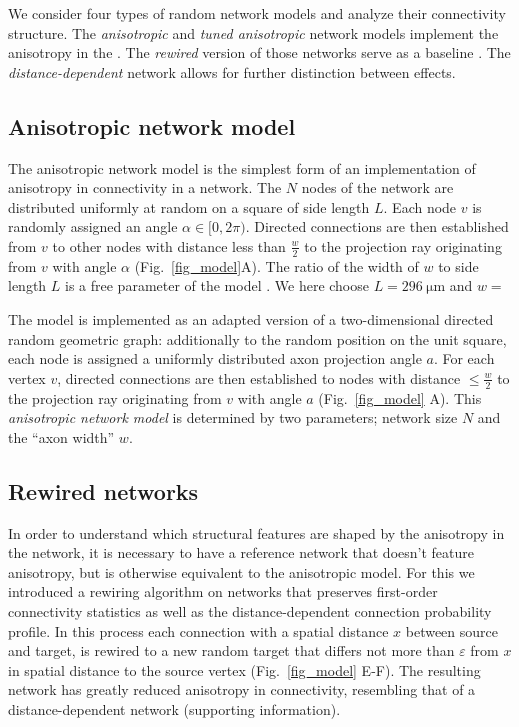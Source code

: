 

We consider four types of random network models and analyze their
connectivity structure. The \textit{anisotropic} and \textit{tuned
anisotropic} network models implement the anisotropy in the
. The \textit{rewired} version of those networks serve as a baseline
. The \textit{distance-dependent} network allows for further
distinction between effects.

\subsection*{Anisotropic network model}

The anisotropic network model is the simplest form of an
implementation of anisotropy in connectivity in a network. The $N$
nodes of the network are distributed uniformly at random on a square
of side length $L$. Each node $v$ is randomly assigned an angle
$\alpha \in [0,2\pi)$. Directed connections are then established from
$v$ to other nodes with distance less than $\frac{w}{2}$ to the
projection ray originating from $v$ with angle $\alpha$
(Fig.~\ref{fig_model}A). The ratio of the width of $w$ to side length
$L$ is a free parameter of the model . We here choose
$L=\SI{296}{\micro\meter}$ and $w=$

The model is implemented as an adapted version of a two-dimensional
directed random geometric graph: additionally to the random position
on the unit square, each node is assigned a uniformly distributed axon
projection angle $a$. For each vertex $v$, directed connections are
then established to nodes with distance $\leq \frac{w}{2}$ to the
projection ray originating from $v$ with angle $a$
(Fig.~\ref{fig_model} A). This \textit{anisotropic network
  model} is determined by two parameters; network size $N$ and the
\enquote{axon width} $w$.




\subsection*{Rewired networks}
%
In order to understand which structural features are shaped by the
anisotropy in the network, it is necessary to have a reference network
that doesn't feature anisotropy, but is otherwise equivalent to the
anisotropic model. For this we introduced a rewiring algorithm on
networks that preserves first-order connectivity statistics %
as well as the distance-dependent connection probability profile. In
this process each connection with a spatial distance $x$ between
source and target, is rewired to a new random target that differs not
more than $\varepsilon$ from $x$ in spatial distance to the source
vertex (Fig.~\ref{fig_model} E-F). The resulting network has greatly
reduced anisotropy in connectivity, resembling that of a
distance-dependent network (supporting information).

